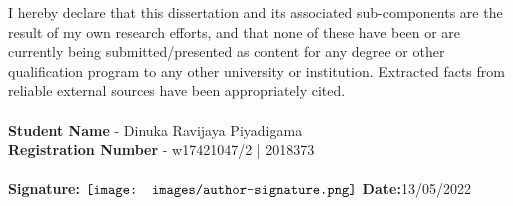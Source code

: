 I hereby declare that this dissertation and its associated sub-components are the result of my own research efforts, and that none of these have been or are currently being submitted/presented as content for any degree or other qualification program to any other university or institution. Extracted facts from reliable external sources have been appropriately cited.
\\
\\
\noindent\textbf{Student Name} - Dinuka Ravijaya Piyadigama \\
\textbf{Registration Number} - w17421047/2 | 2018373
\\
\\
\textbf{Signature:} $\vcenter{\hbox{\texttt{[image: images/author-signature.png]}}}$
\hfill 
\textbf{Date:}13/05/2022
